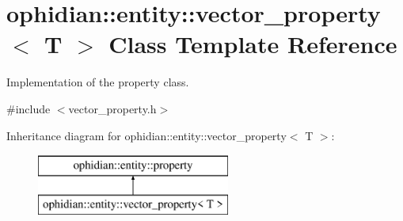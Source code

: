 \hypertarget{classophidian_1_1entity_1_1vector__property}{\section{ophidian\-:\-:entity\-:\-:vector\-\_\-property$<$ T $>$ Class Template Reference}
\label{classophidian_1_1entity_1_1vector__property}
}


Implementation of the property class.  




{\ttfamily \#include $<$vector\-\_\-property.\-h$>$}

Inheritance diagram for ophidian\-:\-:entity\-:\-:vector\-\_\-property$<$ T $>$\-:\begin{figure}[H]
\begin{center}
\leavevmode
\includegraphics[height=2.000000cm]{classophidian_1_1entity_1_1vector__property}
\end{center}
\end{figure}
